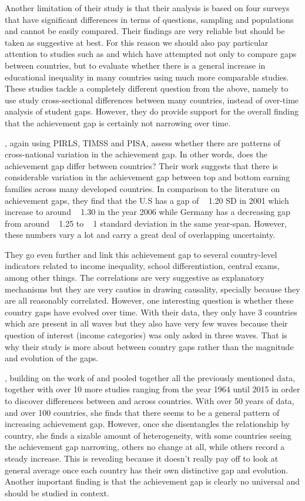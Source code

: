 \documentclass[11pt, a4paper]{article}\usepackage[]{graphicx}\usepackage[]{color}
\begin{document}
Another limitation of their study is that their analysis is based on four surveys that have significant differences in terms of questions, sampling and populations and cannot be easily compared. Their findings are very reliable but should be taken as suggestive at best.  For this reason we should also pay particular attention to studies such as \citet{anna2016} and \citep{anna2016_global} which have attempted not only to compare gaps between countries, but to evaluate whether there is a general increase in educational inequality in many countries using much more comparable studies. These studies tackle a completely different question from the above, namely to use study cross-sectional differences between many countries, instead of over-time analysis of student gaps. However, they do provide support for the overall finding that the achievement gap is certainly not narrowing over time.

\citet{anna2016}, again using PIRLS, TIMSS and PISA, assess whether there are patterns of cross-national variation in the achievement gap. In other words, does the achievement gap differ between countries? Their work suggests that there is considerable variation in the achievement gap between top and bottom earning families across many developed countries. In comparison to the literature on achievement gaps, they find that the U.S has a gap of ~ 1.20 SD in 2001 which increase to around ~ 1.30 in the year 2006 while Germany has a decreasing gap from around ~ 1.25 to ~ 1 standard deviation in the same year-span. However, these numbers vary a lot and carry a great deal of overlapping uncertainty.

They go even further and link this achievement gap to several country-level indicators related to income inequality, school differentiation, central exams, among other things. The correlations are very suggestive  as explanatory mechanisms but they are very cautios in drawing causality, specially because they are all reasonably correlated. However, one interesting question is whether these country gaps have evolved over time. With their data, they only have 3 countries which are present in all waves but they also have very few waves because their question of interest (income categories) was only asked in three waves. That is why their study is more about between country gaps rather than the magnitude and evolution of the gaps.

\citet{anna2016_global}, building on the work of \citet{anna2016} and \citet{reardon_portilla} pooled together all the previously mentioned data, together with over 10 more studies ranging from the year 1964 until 2015 in order to discover differences between and across countries. With over 50 years of data, and over 100 countries, she finds that there seems to be a general pattern of increasing achievement gap. However, once she disentangles the relationship by country, she finds a sizable amount of heterogeneity, with some countries seeing the achievement gap narrowing, others no change at all, while others record a steady increase. This is revealing because it doesn't really pay off to look at general average once each country has their own distinctive gap and evolution. Another important finding is that the achievement gap is clearly no universal and should be studied in context. 
\end{document}
